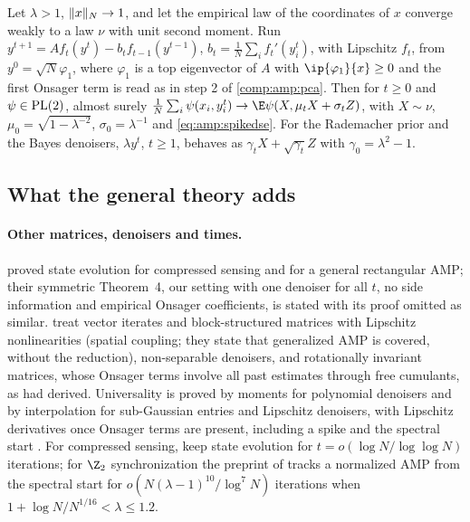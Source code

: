\begin{refsection}
\begin{theorem}\label{thm:amp:spectral}
Let $\lambda>1$, $\lVert x\rVert_N\to1$, and let the empirical law of the coordinates of $x$ converge weakly to a law $\nu$ with unit second moment. Run $y^{t+1}=Af_t(y^t)-b_tf_{t-1}(y^{t-1})$, $b_t=\frac1N\sum_if_t'(y_i^t)$, with Lipschitz $f_t$, from $y^0=\sqrt N\varphi_1$, where $\varphi_1$ is a top eigenvector of $A$ with $\ip{\varphi_1}{x}\ge0$ and the first Onsager term is read as in step 2 of \cref{comp:amp:pca}. Then for $t\ge0$ and $\psi\in\mathrm{PL}(2)$, almost surely $\frac1N\sum_i\psi(x_i,y^t_i)\to\E\psi(X,\mu_tX+\sigma_tZ)$, with $X\sim\nu$, $\mu_0=\sqrt{1-\lambda^{-2}}$, $\sigma_0=\lambda^{-1}$ and \eqref{eq:amp:spikedse}. For the Rademacher prior and the Bayes denoisers, $\lambda y^t$, $t\ge1$, behaves as $\gamma_tX+\sqrt{\gamma_t}Z$ with $\gamma_0=\lambda^2-1$.
\end{theorem}

\subsection{What the general theory adds}\label{sec:amp:general}

\paragraph{Other matrices, denoisers and times.} \Textcite{BayatiMontanari2011} proved state evolution for compressed sensing and for a general rectangular AMP; their symmetric Theorem~4, our setting with one denoiser for all $t$, no side information and empirical Onsager coefficients, is stated with its proof omitted as similar. \Textcite{JavanmardMontanari2013} treat vector iterates and block-structured matrices with Lipschitz nonlinearities (spatial coupling; they state that generalized AMP is covered, without the reduction), \textcite{BerthierMontanariNguyen2020} non-separable denoisers, and \textcite{Fan2022} rotationally invariant matrices, whose Onsager terms involve all past estimates through free cumulants, as \textcite{OpperCakmakWinther2016} had derived. Universality is proved by moments for polynomial denoisers \parencite[Thms.~3--4]{BayatiLelargeMontanari2015} and by interpolation for sub-Gaussian entries and Lipschitz denoisers, with Lipschitz derivatives once Onsager terms are present, including a spike and the spectral start \parencite[Thms.~2.1--2.3]{ChenLam2021}. For compressed sensing, \textcite[Thm.~1]{RushVenkataramanan2018} keep state evolution for $t=o(\log N/\log\log N)$ iterations; for $\Z_2$ synchronization the preprint of \textcite[v2, Thm.~4]{LiWei2022} tracks a normalized AMP from the spectral start for $o(N(\lambda-1)^{10}/\log^7N)$ iterations when $1+\log N/N^{1/16}<\lambda\le1.2$.


\end{refsection}

